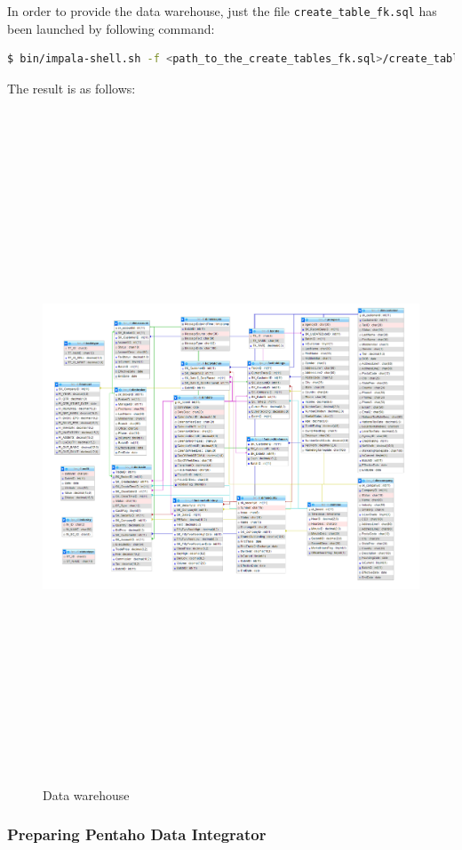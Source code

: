 \documentclass{article}
\newcommand\pcw[1]{\texttt{#1}}
\begin{document}
In order to provide the data warehouse, just the file \pcw{create\_table\_fk.sql} has been launched by following command:
\begin{lstlisting}[language=bash]
$ bin/impala-shell.sh -f <path_to_the_create_tables_fk.sql>/create_tables_fk.sql
\end{lstlisting}
The result is as follows:
\begin{figure}[H] 
\begin{center}
\includegraphics[width=\textwidth, height=20cm]{images2/tables.png}
\end{center}
\caption{Data warehouse}
\label{Tables}
\end{figure} 

\subsubsection{Preparing Pentaho Data Integrator}
\end{document}
